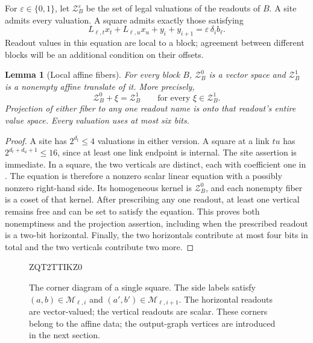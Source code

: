 \documentclass[11pt]{article}
\newtheorem{lemma}[theorem]{Lemma}
\theoremstyle{definition}
\begin{document}
For \(\varepsilon\in\{0,1\}\), let \(\mathcal Z_B^\varepsilon\) be the set of legal valuations
of the readouts of \(B\). A site admits every valuation. A square admits
exactly those satisfying
\begin{equation}
 L_{\ell,t}x_t+L_{\ell,u}x_u+y_i+y_{i+1}
       =\varepsilon\,\delta_i b_\ell.
 \label{eq:square-equation}
\end{equation}
Readout values in this equation are local to a block; agreement between
different blocks will be an additional condition on their offsets.

\begin{lemma}[Local affine fibers]
\label{lem:block-fibers}
For every block \(B\), \(\mathcal Z_B^0\) is a vector space and \(\mathcal Z_B^1\)
is a nonempty affine translate of it. More precisely,
\[
 \mathcal Z_B^0+\xi=\mathcal Z_B^1\qquad\text{for every }\xi\in\mathcal Z_B^1.
\]
Projection of either fiber to any one readout name is onto that
readout's entire value space. Every valuation uses at most six bits.
\end{lemma}

\begin{proof}
A site has \(2^{d_t}\le4\) valuations in either version.
A square at a link \(tu\) has \(2^{d_t+d_u+1}\le16\), since at least
one link endpoint is internal. The site assertion is immediate. In a square, the two verticals are
distinct, each with coefficient one in .
The equation is therefore a nonzero scalar linear equation with a
possibly nonzero right-hand side. Its homogeneous kernel is
\(\mathcal Z_B^0\), and each nonempty fiber is a coset of that kernel.
After prescribing any one readout, at least one vertical remains free
and can be set to satisfy the equation. This proves both nonemptiness
and the projection assertion, including when the prescribed readout is
a two-bit horizontal. Finally, the two horizontals contribute at most
four bits in total and the two verticals contribute two more.
\end{proof}

\begin{figure}[tbp]

ZQT2TTIKZ0
\caption{The corner diagram of a single square. The side labels satisfy
\((a,b)\in\mathcal M_{\ell,i}\) and
\((a',b')\in\mathcal M_{\ell,i+1}\). The horizontal readouts are vector-valued;
the vertical readouts are scalar.
These corners belong to the affine data; the output-graph vertices are
introduced in the next section.}
\label{offset:fig-square}
\end{figure}
\end{document}
